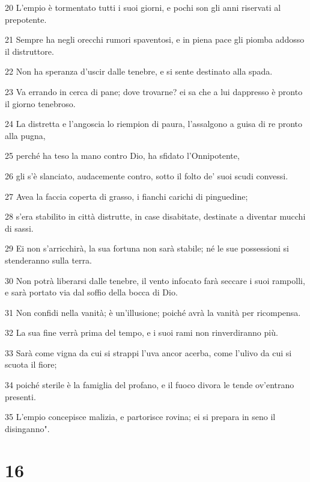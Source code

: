 \par 20 L'empio è tormentato tutti i suoi giorni, e pochi son gli anni riservati al prepotente.
\par 21 Sempre ha negli orecchi rumori spaventosi, e in piena pace gli piomba addosso il distruttore.
\par 22 Non ha speranza d'uscir dalle tenebre, e si sente destinato alla spada.
\par 23 Va errando in cerca di pane; dove trovarne? ei sa che a lui dappresso è pronto il giorno tenebroso.
\par 24 La distretta e l'angoscia lo riempion di paura, l'assalgono a guisa di re pronto alla pugna,
\par 25 perché ha teso la mano contro Dio, ha sfidato l'Onnipotente,
\par 26 gli s'è slanciato, audacemente contro, sotto il folto de' suoi scudi convessi.
\par 27 Avea la faccia coperta di grasso, i fianchi carichi di pinguedine;
\par 28 s'era stabilito in città distrutte, in case disabitate, destinate a diventar mucchi di sassi.
\par 29 Ei non s'arricchirà, la sua fortuna non sarà stabile; né le sue possessioni si stenderanno sulla terra.
\par 30 Non potrà liberarsi dalle tenebre, il vento infocato farà seccare i suoi rampolli, e sarà portato via dal soffio della bocca di Dio.
\par 31 Non confidi nella vanità; è un'illusione; poiché avrà la vanità per ricompensa.
\par 32 La sua fine verrà prima del tempo, e i suoi rami non rinverdiranno più.
\par 33 Sarà come vigna da cui si strappi l'uva ancor acerba, come l'ulivo da cui si scuota il fiore;
\par 34 poiché sterile è la famiglia del profano, e il fuoco divora le tende ov'entrano presenti.
\par 35 L'empio concepisce malizia, e partorisce rovina; ei si prepara in seno il disinganno".

\chapter{16}

